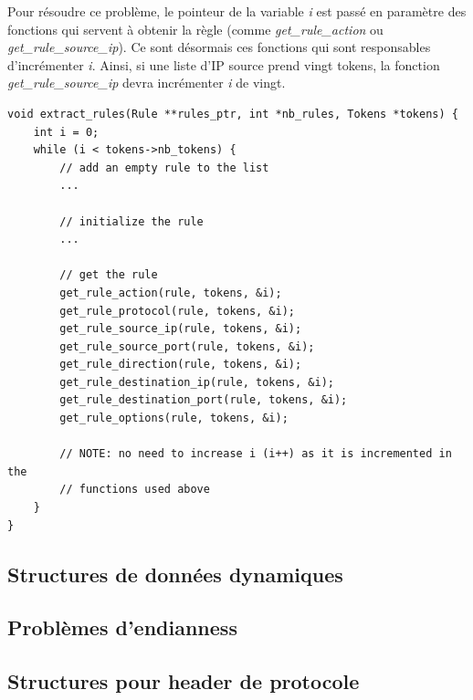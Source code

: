 \documentclass[a4paper]{article}
\begin{document}
Pour résoudre ce problème, le pointeur de la variable \textit{i} est passé en paramètre des fonctions qui servent à obtenir la règle (comme \textit{get\_rule\_action} ou \textit{get\_rule\_source\_ip}). Ce sont désormais ces fonctions qui sont responsables d'incrémenter \textit{i}. Ainsi, si une liste d'IP source prend vingt tokens, la fonction \textit{get\_rule\_source\_ip} devra incrémenter \textit{i} de vingt.
\begin{lstlisting}[style=CStyle]
void extract_rules(Rule **rules_ptr, int *nb_rules, Tokens *tokens) {
    int i = 0;
    while (i < tokens->nb_tokens) {
        // add an empty rule to the list
        ...

        // initialize the rule
        ...

        // get the rule
        get_rule_action(rule, tokens, &i);
        get_rule_protocol(rule, tokens, &i);
        get_rule_source_ip(rule, tokens, &i);
        get_rule_source_port(rule, tokens, &i);
        get_rule_direction(rule, tokens, &i);
        get_rule_destination_ip(rule, tokens, &i);
        get_rule_destination_port(rule, tokens, &i);
        get_rule_options(rule, tokens, &i);

        // NOTE: no need to increase i (i++) as it is incremented in the
        // functions used above
    }
}
\end{lstlisting}





\subsection{Structures de données dynamiques}








\subsection{Problèmes d'endianness}








\subsection{Structures pour header de protocole}
\end{document}
